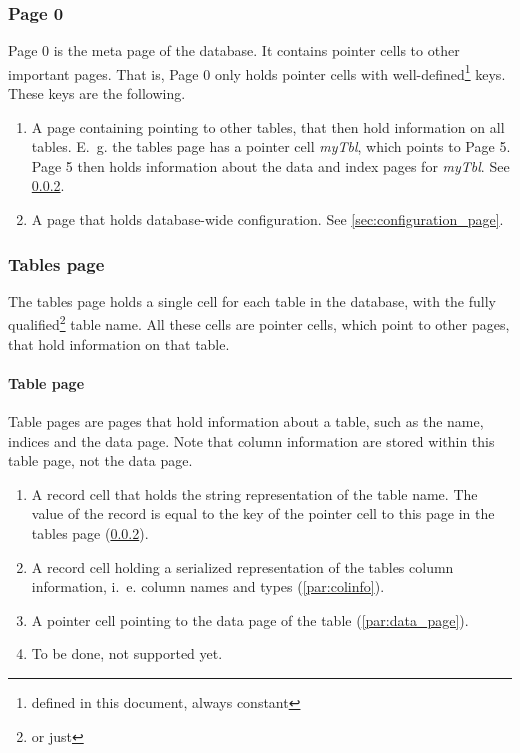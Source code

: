 \subsubsection{Page 0}
\label{sec:page_0}
Page 0 is the meta page of the database.
It contains pointer cells to other important pages.
That is, Page 0 only holds pointer cells with well-defined\footnote{defined in this document, always constant} keys.
These keys are the following.

\begin{enumerate}
    \item[\go{tables}] A page containing pointing to other tables, that then hold information on all tables. E.~g. the tables page has a pointer cell \emph{myTbl}, which points to Page 5. Page 5 then holds information about the data and index pages for \emph{myTbl}. See \ref{sec:tables_page}.
    \item[\go{config}] A page that holds database-wide configuration. See \ref{sec:configuration_page}.
\end{enumerate}

\subsubsection{Tables page}
\label{sec:tables_page}
The tables page holds a single cell for each table in the database, with the fully qualified\footnote{ or just } table name.
All these cells are pointer cells, which point to other pages, that hold information on that table.

\paragraph{Table page}
\label{par:table_page}
Table pages are pages that hold information about a table, such as the name, indices and the data page.
Note that column information are stored within this table page, not the data page.

\begin{enumerate}
    \item[\go{name}] A record cell that holds the string representation of the table name. The value of the record is equal to the key of the pointer cell to this page in the tables page (\ref{sec:tables_page}).
    \item[\go{colinfo}] A record cell holding a serialized representation of the tables column information, i.~e. column names and types (\ref{par:colinfo}).
    \item[\go{data}] A pointer cell pointing to the data page of the table (\ref{par:data_page}).
    \item[\go{index.<indexName>}] To be done, not supported yet.
\end{enumerate}

